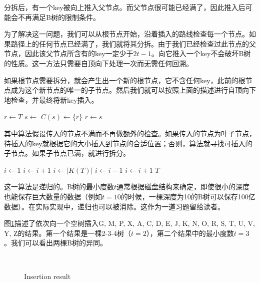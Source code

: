 \documentclass[UTF8]{article}
\begin{document}
分拆后，有一个key被向上推入父节点。而父节点很可能已经满了，因此推入后可能会不再满足B树的限制条件。

为了解决这一问题，我们可以从根节点开始，沿着插入的路线检查每一个节点。如果路径上的任何节点已经满了，我们就将其分拆。由于我们已经检查过此节点的父节点，因此该父节点所含有的key一定少于$2t-1$。向它推入一个key不会破坏B树的性质。这一方法只需要自顶向下处理一次而无需任何回溯。

如果根节点需要拆分，就会产生出一个新的根节点，它不含任何key，此前的根节点成为这个新节点的唯一的子节点。然后我们就可以按照上面的描述进行自顶向下地检查，并最终将新key插入。

\begin{algorithmic}[1]
  \State $r \gets T$
   
    \State $s \gets$ 
    \State $C(s) \gets \{r\}$
    \State {}
    \State $r \gets s$
  \EndIf
  \State \Return {}
\EndFunction
\end{algorithmic}

其中算法假设传入的节点不满而不再做额外的检查。如果传入的节点为叶子节点，待插入的key就根据它的大小插入到节点的合适位置；否则，算法就寻找可插入的子节点。如果子节点已满，就进行拆分。

\begin{algorithmic}[1]
    \State $i \gets 1$
      \State $i \gets i+1$
    \EndWhile
    \State {}
  \Else
    \State $i \gets |K(T)|$
      \State $i \gets i-1$
    \EndWhile
      \State {}
        \State $i \gets i+1$
      \EndIf
    \EndIf
    \State {}
  \EndIf
  \State \Return $T$
\EndFunction
\end{algorithmic}

这一算法是递归的。B树的最小度数$t$通常根据磁盘结构来确定，即使很小的深度也能保存巨大数量的数据（例如$t=10$的时候，一棵深度为10的B树可以保存100亿数据）。在实际实现中，递归也可以被消除。这作为一道习题留给读者。

图\ref{fig:btree-insert}描述了依次向一个空树插入G, M, P, X, A, C, D, E, J, K, N, O, R, S, T, U, V, Y, Z的结果。第一个结果是一棵2-3-4树（$t=2$），第二个结果中的最小度数$t=3$。我们可以看出两棵B树的异同。

\begin{figure}[htbp]
  \centering
  \\
  \caption{Insertion result} \label{fig:btree-insert}
\end{figure}
\end{document}
